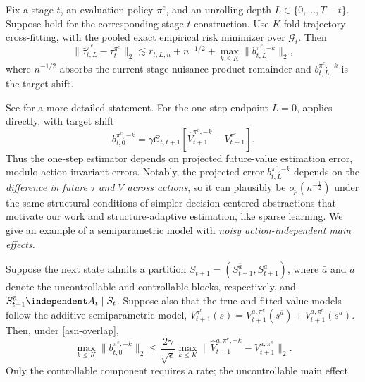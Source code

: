 \documentclass[opre,nonblindrev]{informs4}
\newenvironment{revision}{\begingroup\color{revisionblue}\ignorespaces}{\endgroup}
\providecommand{\cG}{\mathcal G}
\providecommand{\cC}{\mathcal C}
\newcommand{\norm}[1]{\lVert#1\rVert}
\newcommand{\blipadv}{\tau}
\begin{document}
\begin{revision}
\begin{theorem}
\label{thm-policy-evaluation}
Fix a stage $t$, an evaluation policy $\pi^e$, and an unrolling depth
$L\in\{0,\ldots,T-t\}$. Suppose
hold for the corresponding stage-$t$ construction. Use $K$-fold
trajectory cross-fitting, with the pooled exact empirical risk minimizer
over $\cG_t$. Then
\begin{equation}
\norm{
\hat\blipadv_{t,L}^{\pi^e}
-
\blipadv_t^{\pi^e}
}_2
\lesssim
r_{t,L,n}
+n^{-1/2}
+
\max_{k\le K}
\norm{b_{t,L}^{\pi^e,-k}}_2,
\label{eq:diff-generic-main-theorem}
\end{equation}
where $n^{-1/2}$ absorbs the current-stage nuisance-product
remainder and $b_{t,L}^{\pi^e,-k}$ is the target shift.
\end{theorem}
See  for a more detailed statement. For the one-step endpoint $L=0$,  applies
directly, with target shift
\[
b_{t,0}^{\pi^e,-k}
=
\gamma\cC_{t,t+1}
\left[
\hat V_{t+1}^{\pi^e,-k}-V_{t+1}^{\pi^e}
\right].
\]
Thus the one-step estimator depends on projected future-value estimation error,
modulo action-invariant errors. Notably, the projected error $b_{t,L}^{\pi^e,-k}$ depends on the \textit{difference in future $\blipadv$ and $V$ across actions}, so it can plausibly be $o_p(n^{-\frac 12})$ under the same structural conditions of simpler decision-centered abstractions that motivate our work and structure-adaptive estimation, like sparse learning. We give an example of a semiparametric model with \textit{noisy action-independent main effects.}  
\begin{corollary}
\label{cor:diff-main-uncontrollable-continuation}
Suppose the next state admits a partition
$S_{t+1}=(S_{t+1}^{\bar a},S_{t+1}^{a})$, where \(\bar a\) and \(a\)
denote the uncontrollable and controllable blocks, respectively, and
$S_{t+1}^{\bar a}\independent A_t\mid S_t$. Suppose also that the true
and fitted value models follow the additive semiparametric model, $V_{t+1}^{\pi^e}(s)
=V_{t+1}^{\bar a,\pi^e}(s^{\bar a})
+V_{t+1}^{a,\pi^e}(s^{a})$. Then, under
\cref{asn-overlap},
\[
\max_{k\le K}\norm{b_{t,0}^{\pi^e,-k}}_2
\le
\frac{2\gamma}{\sqrt\epsilon}\max_{k\le K}
\norm{\hat V_{t+1}^{a,\pi^e,-k}-V_{t+1}^{a,\pi^e}}_2.
\]
Only the controllable component requires a rate; the uncontrollable main effect

\end{corollary}
\end{revision}
\end{document}
